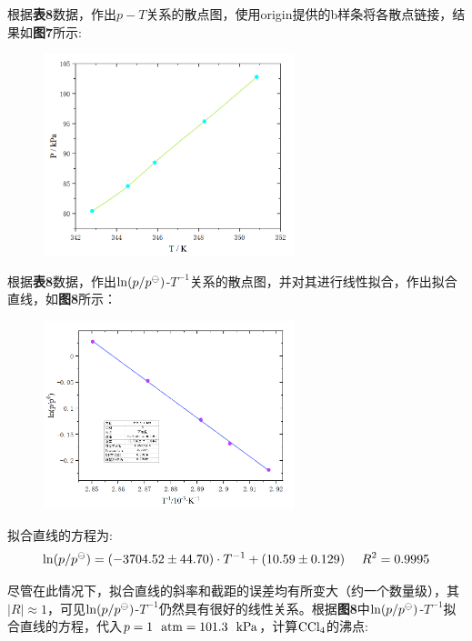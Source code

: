 \documentclass[12pt]{article}
\begin{document}
		\par
		根据\textbf{表8}数据，作出$p-T$关系的散点图，使用origin提供的b样条将各散点链接，结果如\textbf{图7}所示:
		\begin{figure}[!h]
			\centering
			\includegraphics[width=0.65\textwidth]{7.png}
		\end{figure}
		\par
		根据\textbf{表8}数据，作出${\rm ln}(p/p^{\ominus})$-$T^{-1}$关系的散点图，并对其进行线性拟合，作出拟合直线，如\textbf{图8}所示：
		\begin{figure}[!h]
			\centering
			\includegraphics[width=0.65\textwidth]{8.png}
		\end{figure}
		\par
		拟合直线的方程为:
		$$
			{\rm ln}(p/p^{\ominus})=(-3704.52\pm 44.70)\cdot T^{-1}+(10.59 \pm 0.129) \ \ \ \ R^{2}=0.9995
		$$
		\par
		尽管在此情况下，拟合直线的斜率和截距的误差均有所变大（约一个数量级），其$|R|\approx 1$，可见${\rm ln}(p/p^{\ominus})$-$T^{-1}$仍然具有很好的线性关系。根据\textbf{图8}中${\rm ln}(p/p^{\ominus})$-$T^{-1}$拟合直线的方程，代入$p=1\ \ {\rm atm}=101.3\ \ {\rm kPa}$，计算$\rm CCl_{4}$的沸点:\par
\end{document}
